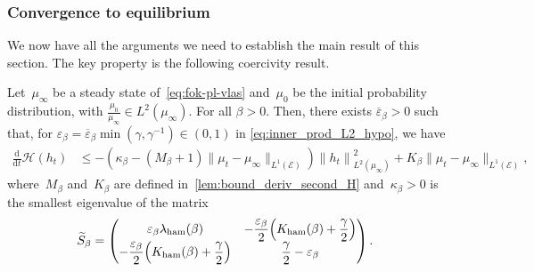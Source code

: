 \documentclass[onefignum,onetabnum]{siamart251216} %
\renewcommand{\d}{\mathrm{d}}
\newcommand{\norm}[1]{\left\lVert#1\right\rVert}
\newcommand{\mc}[1]{\mathcal{#1}}
\renewcommand{\leq}{\leqslant}
\newcommand{\mescin}{\mu}
\newcommand{\norml}[1]{\norm{#1}_{L^2(\mescin_\infty)}}
\newcommand{\eps}{\varepsilon}
\newcommand{\lambham}{\lambda_{\rm{ham}}(\beta)}
\newcommand{\kham}{K_{\rm{ham}}(\beta)}
\theoremstyle{plain}
\numberwithin{equation}{section}
\numberwithin{theorem}{section}
\begin{document}
\subsubsection{Convergence to equilibrium}
\label{subsub:equilibrium}
We now have all the arguments we need to establish the main result of this section. The key property is the following coercivity result.
\begin{proposition}
    \label{prop:gen_non_lin_trou_spec}
    Let~$\mescin_\infty$ be a steady state of~\eqref{eq:fok-pl-vlas} and~$\mu_0$ be the initial probability distribution, with
    $
    \frac{\mescin_0}{\mescin_\infty} \in L^2(\mescin_\infty).
    $
    For all $\beta>0$. Then, there exists $\overline{\eps}_{\beta} >0$ such that, for $\eps_{\beta} = \overline{\eps}_{\beta}\min(\gamma,\gamma^{-1}) \in (0,1)$ in \eqref{eq:inner_prod_L2_hypo}, we have
        \begin{align}
        \label{eq:bound_with_cubic_norm}
         \frac{\d}{\d t}\mc{H}(h_t)
         &\leq -\left(\kappa_\beta
         - \left( M_\beta + 1
         \right)\!\|\mescin_t - \mescin_\infty\|_{L^1(\mc{E})}\right)\norml{h_t}^2 + K_\beta \|\mescin_t - \mescin_\infty\|_{L^1(\mc{E})},
        \end{align}
        where~$M_{\beta}$ and~$K_{\beta}$ are defined in~\cref{lem:bound_deriv_second_H} and~$\kappa_{\beta} > 0$ is the smallest eigenvalue of the matrix
        \begin{align}
        \label{eq:matrix_S}
        \widetilde S_{\beta} &= \begin{pmatrix}
            \displaystyle\eps_{\beta}\lambham & \displaystyle-\frac{\eps_{\beta}}{2}\!\left(\kham + \frac{\gamma}{2}\right) \\
            \displaystyle-\frac{\eps_{\beta}}{2}\!\left(\kham + \frac{\gamma}{2}\right) & \displaystyle \frac{\gamma}{2}- \eps_{\beta}
            \end{pmatrix}.
    \end{align}
\end{proposition}
\end{document}
